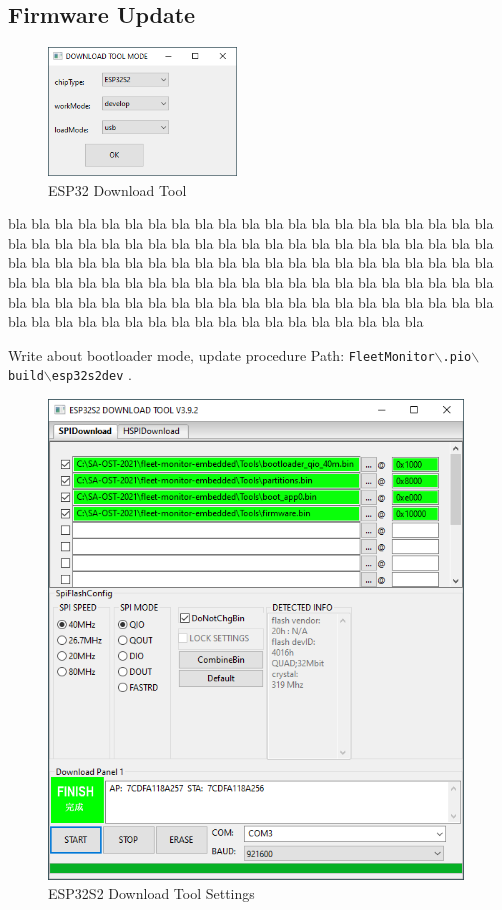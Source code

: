 \subsection{Firmware Update} \label{Firmware Update}
\begin{figure}
\vspace{-0.6cm}
\includegraphics[width=5.0cm]{images/ESP32_Download_Mode}
\caption{ESP32 Download Tool}
\label{fig:esp32-download-tool}
\end{figure} 
bla bla bla bla bla bla bla bla bla bla bla bla bla bla bla bla bla bla bla bla bla bla bla bla bla bla bla bla bla bla bla bla bla bla bla bla bla bla bla bla bla bla bla bla bla bla bla bla bla bla bla bla bla bla bla bla bla bla bla bla bla bla bla bla bla bla bla bla bla bla bla bla bla bla bla bla bla bla bla bla bla bla bla bla bla bla bla bla bla bla bla bla bla bla bla bla bla bla bla bla bla bla bla bla bla bla bla bla bla bla bla bla bla bla bla bla bla bla bla bla bla bla bla 

Write about bootloader mode, update procedure
Path: \texttt{FleetMonitor$\backslash$.pio$\backslash$build$\backslash$esp32s2dev}
\cite{flash-download-tools}.


\begin{figure}[h!]
	\centering
	\includegraphics[width=11cm]{images/ESP32_Firmware_Settings}
	\caption{ESP32S2 Download Tool Settings}
	\label{fig:esp32s2-download-tool-settings}
\end{figure}
\newpage

